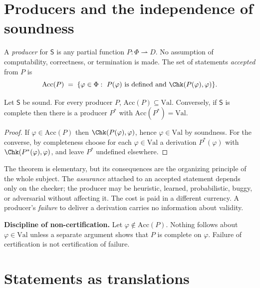 \section{Producers and the independence of soundness}

\begin{definition}[Producer]
\label{def:producer}
A \emph{producer} for $\mathsf{S}$ is any partial function $P:\Phi\rightharpoonup D$. No assumption of computability, correctness, or termination is made. The set of statements \emph{accepted} from $P$ is
\[
\mathrm{Acc}(P)\;=\;\{\varphi\in\Phi:\ P(\varphi)\text{ is defined and }\Chk(P(\varphi),\varphi)\}.
\]
\end{definition}

\begin{theorem}
\label{thm:independence}
Let $\mathsf{S}$ be sound. For every producer $P$, $\mathrm{Acc}(P)\subseteq\mathrm{Val}$. Conversely, if $\mathsf{S}$ is complete then there is a producer $P^\ast$ with $\mathrm{Acc}(P^\ast)=\mathrm{Val}$.
\end{theorem}

\begin{proof}
If $\varphi\in\mathrm{Acc}(P)$ then $\Chk(P(\varphi),\varphi)$, hence $\varphi\in\mathrm{Val}$ by soundness. For the converse, by completeness choose for each $\varphi\in\mathrm{Val}$ a derivation $P^\ast(\varphi)$ with $\Chk(P^\ast(\varphi),\varphi)$, and leave $P^\ast$ undefined elsewhere.
\end{proof}

The theorem is elementary, but its consequences are the organizing principle of the whole subject. The \emph{assurance} attached to an accepted statement depends only on the checker; the producer may be heuristic, learned, probabilistic, buggy, or adversarial without affecting it. The cost is paid in a different currency. A producer's \emph{failure} to deliver a derivation carries no information about validity.

\begin{principal}
\textbf{Discipline of non-certification.} Let $\varphi\notin\mathrm{Acc}(P)$. Nothing follows about $\varphi\in\mathrm{Val}$ unless a separate argument shows that $P$ is complete on $\varphi$. Failure of certification is not certification of failure.
\end{principal}

\section{Statements as translations}
\label{sec:translation}

